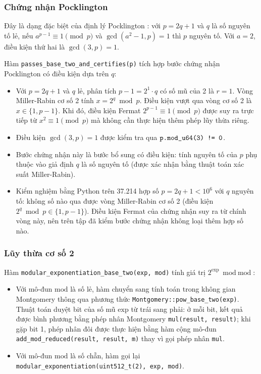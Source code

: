 \subsubsection{Chứng nhận Pocklington}

Đây là dạng đặc biệt của định lý Pocklington \cite{menezes1996handbook}: với $p = 2q + 1$ và $q$ là số nguyên tố lẻ, nếu $a^{p-1} \equiv 1 \pmod p$ và $\gcd(a^2 - 1, p) = 1$ thì $p$ nguyên tố. Với $a = 2$, điều kiện thứ hai là $\gcd(3, p) = 1$.

Hàm \texttt{passes\_\allowbreak{}base\_\allowbreak{}two\_\allowbreak{}and\_\allowbreak{}certifies(p)} tích hợp bước chứng nhận Pocklington có điều kiện dựa trên $q$:
\begin{itemize}
    \item Với $p = 2q + 1$ và $q$ lẻ, phân tích $p - 1 = 2^1 \cdot q$ có số mũ của 2 là $r = 1$. Vòng Miller-Rabin cơ số 2 tính $x = 2^q \bmod p$. Điều kiện vượt qua vòng cơ số 2 là $x \in \{1, p - 1\}$. Khi đó, điều kiện Fermat $2^{p-1} \equiv 1 \pmod p$ được suy ra trực tiếp từ $x^2 \equiv 1 \pmod p$ mà không cần thực hiện thêm phép lũy thừa riêng.
    \item Điều kiện $\gcd(3, p) = 1$ được kiểm tra qua $\texttt{p.mod\_\allowbreak{}u64(3) != 0}$.
    \item Bước chứng nhận này là bước bổ sung có điều kiện: tính nguyên tố của $p$ phụ thuộc vào giả định $q$ là số nguyên tố (được xác nhận bằng thuật toán xác suất Miller-Rabin).
    \item Kiểm nghiệm bằng Python trên 37.214 hợp số $p = 2q + 1 < 10^6$ với $q$ nguyên tố: không số nào qua được vòng Miller-Rabin cơ số 2 (điều kiện $2^q \bmod p \in \{1, p-1\}$). Điều kiện Fermat của chứng nhận suy ra từ chính vòng này, nên trên tập đã kiểm bước chứng nhận không loại thêm hợp số nào.
\end{itemize}

\subsubsection{Lũy thừa cơ số 2}

Hàm \texttt{modular\_\allowbreak{}exponentiation\_\allowbreak{}base\_\allowbreak{}two(exp, mod)} tính giá trị $2^{\text{exp}} \bmod \text{mod}$:
\begin{itemize}
    \item Với mô-đun $\text{mod}$ là số lẻ, hàm chuyển sang tính toán trong không gian Montgomery thông qua phương thức \texttt{Montgomery::pow\_\allowbreak{}base\_\allowbreak{}two(exp)}. Thuật toán duyệt bit của số mũ $\text{exp}$ từ trái sang phải: ở mỗi bit, kết quả được bình phương bằng phép nhân Montgomery \texttt{mul(result, result)}; khi gặp bit 1, phép nhân đôi được thực hiện bằng hàm cộng mô-đun \texttt{add\_\allowbreak{}mod\_\allowbreak{}reduced(result, result, m)} thay vì gọi phép nhân \texttt{mul}.
    \item Với mô-đun $\text{mod}$ là số chẵn, hàm gọi lại \texttt{modular\_\allowbreak{}exponentiation(uint512\_\allowbreak{}t(2), exp, mod)}.
\end{itemize}

